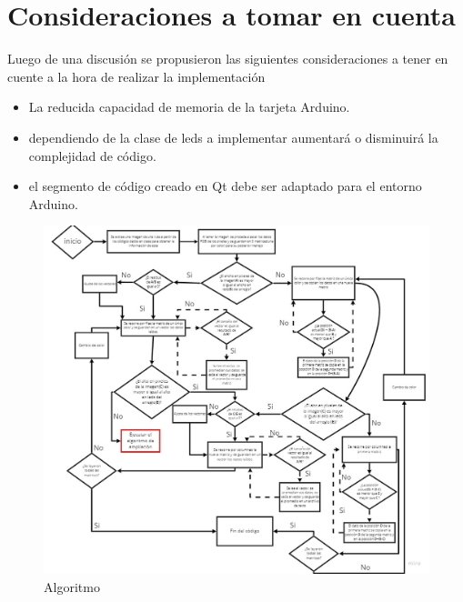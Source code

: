 \documentclass{article}
\begin{document}
	\section{Consideraciones a tomar en cuenta}
	Luego de una discusión se propusieron las siguientes consideraciones a tener en cuente a la hora de realizar la implementación
	\begin{itemize}
		\item La reducida capacidad de memoria de la tarjeta Arduino.
		\item dependiendo de la clase de leds a implementar aumentará o disminuirá la complejidad de código. 
		\item el segmento de código creado en Qt debe ser adaptado para el entorno Arduino.
	\end{itemize}
	\begin{figure}[h]
		\includegraphics[width=12cm]{circuitando (7).jpg}
		\centering
		\caption{Algoritmo}
		\label{fig:figura 3}
	\end{figure}
	
\end{document}
